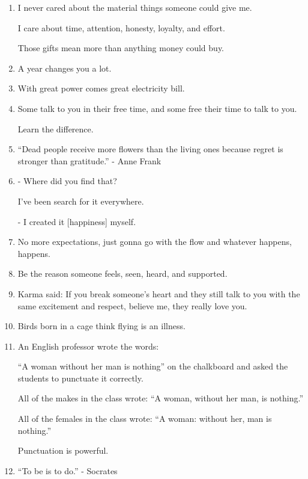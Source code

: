 \documentclass{article}
\numberwithin{equation}{section}
\begin{document}
\begin{enumerate}
    Your thoughts are positive.
    
    Your vision is clear.
    
    You're at peace, at peace with where you've been, at peace with what you've been though and at peace with where you're headed.
    \item I never cared about the material things someone could give me.
    
    I care about time, attention, honesty, loyalty, and effort.
    
    Those gifts mean more than anything money could buy.
    \item A year changes you a lot.
    \item With great power comes great electricity bill.
    \item Some talk to you in their free time, and some free their time to talk to you.
    
    Learn the difference.
    \item ``Dead people receive more flowers than the living ones because regret is stronger than gratitude.'' - Anne Frank
    \item - Where did you find that?
    
    I've been search for it everywhere.
    
    - I created it [happiness] myself.
    \item No more expectations, just gonna go with the flow and whatever happens, happens.
    \item Be the reason someone feels, seen, heard, and supported.
    \item Karma said: If you break someone's heart and they still talk to you with the same excitement and respect, believe me, they really love you.
    \item Birds born in a cage think flying is an illness.
    \item An English professor wrote the words:
    
    ``A woman without her man is nothing'' on the chalkboard and asked the students to punctuate it correctly.
    
    All of the makes in the class wrote: ``A woman, without her man, is nothing.''
    
    All of the females in the class wrote: ``A woman: without her, man is nothing.''
    
    Punctuation is powerful.
    \item ``To be is to do.'' - Socrates
    

\end{enumerate}
\end{document}
